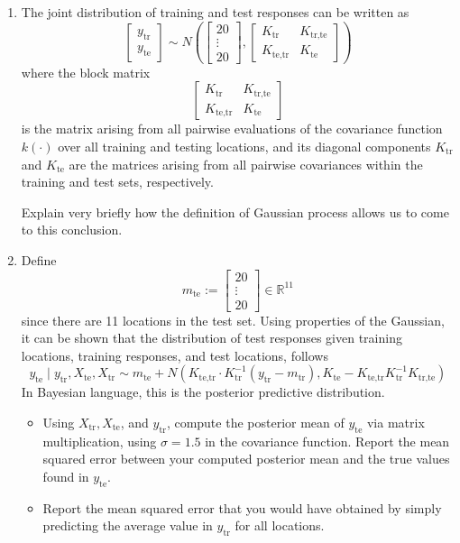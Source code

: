 \documentclass{article}
\begin{document}
\begin{enumerate}
\begin{enumerate}
\item The joint distribution of training and test responses can be written as
    \[
    \begin{bmatrix} y_{\text{tr}} \\ y_{\text{te}} \end{bmatrix} \sim N\left(\begin{bmatrix} 20 \\ \vdots \\ 20 \end{bmatrix}, \begin{bmatrix} K_{\text{tr}} & K_{\text{tr,te}} \\ K_{\text{te,tr}} & K_{\text{te}} \end{bmatrix}\right)
    \]
    where the block matrix
    \[
    \begin{bmatrix} K_{\text{tr}} & K_{\text{tr,te}} \\ K_{\text{te,tr}} & K_{\text{te}} \end{bmatrix}
    \]
    is the matrix arising from all pairwise evaluations of the covariance function $k(\cdot)$ over all training and testing locations, and its diagonal components $K_{\text{tr}}$ and $K_{\text{te}}$ are the matrices arising from all pairwise covariances within the training and test sets, respectively.

    Explain very briefly how the definition of Gaussian process allows us to come to this conclusion.

\item Define
    \[
    m_{\text{te}} := \begin{bmatrix} 20 \\ \vdots \\ 20 \end{bmatrix} \in \mathbb{R}^{11}
    \]
    since there are 11 locations in the test set. Using properties of the Gaussian, it can be shown that the distribution of test responses given training locations, training responses, and test locations, follows
    \[
    y_{\text{te}} \mid y_{\text{tr}}, X_{\text{te}}, X_{\text{tr}} \sim m_{\text{te}} + N\left(K_{\text{te,tr}} \cdot K_{\text{tr}}^{-1}(y_{\text{tr}} - m_{\text{tr}}), K_{\text{te}} - K_{\text{te,tr}} K_{\text{tr}}^{-1} K_{\text{tr,te}}\right)
    \]
    In Bayesian language, this is the posterior predictive distribution.

    \begin{itemize}
    \item Using $X_{\text{tr}}, X_{\text{te}}$, and $y_{\text{tr}}$, compute the posterior mean of $y_{\text{te}}$ via matrix multiplication, using $\sigma=1.5$ in the covariance function. Report the mean squared error between your computed posterior mean and the true values found in $y_{\text{te}}$.
    \item Report the mean squared error that you would have obtained by simply predicting the average value in $y_{\text{tr}}$ for all locations.
    \end{itemize}


\end{enumerate}
\end{enumerate}
\end{document}

